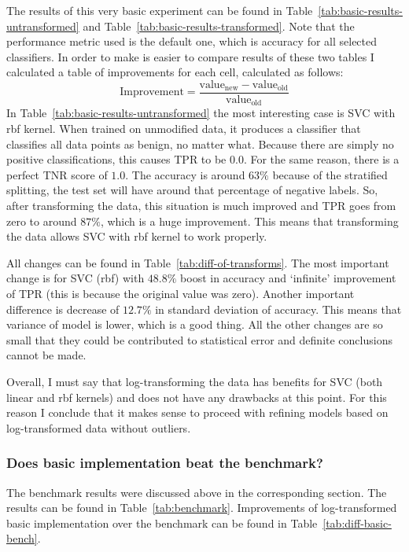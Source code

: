 \documentclass[10pt, a4paper]{article}
\begin{document}
The results of this very basic experiment can be found in Table~\ref{tab:basic-results-untransformed} and Table~\ref{tab:basic-results-transformed}. Note that the performance metric used is the default one, which is accuracy for all selected classifiers. In order to make is easier to compare results of these two tables I calculated a table of improvements for each cell, calculated as follows:
$$ \text{Improvement} = \frac{\text{value}_{\text{new}} - \text{value}_{\text{old}}}{\text{value}_{\text{old}}}  $$
In Table~\ref{tab:basic-results-untransformed} the most interesting case is SVC with rbf kernel. When trained on unmodified data, it produces a classifier that classifies all data points as benign, no matter what. Because there are simply no positive classifications, this causes TPR to be $0.0$. For the same reason, there is a perfect TNR score of $1.0$. The accuracy is around $63\%$ because of the stratified splitting, the test set will have around that percentage of negative labels. So, after transforming the data, this situation is much improved and TPR goes from zero to around $87\%$, which is a huge improvement. This means that transforming the data allows SVC with rbf kernel to work properly.

All changes can be found in Table~\ref{tab:diff-of-transforms}. The most important change is for SVC (rbf) with $48.8\%$ boost in accuracy and `infinite' improvement of TPR (this is because the original value was zero). Another important difference is decrease of $12.7\%$ in standard deviation of accuracy. This means that variance of model is lower, which is a good thing. All the other changes are so small that they could be contributed to statistical error and definite conclusions cannot be made.



Overall, I must say that log-transforming the data has benefits for SVC (both linear and rbf kernels) and does not have any drawbacks at this point. For this reason I conclude that it makes sense to proceed with refining models based on log-transformed data without outliers.

\subsubsection{Does basic implementation beat the benchmark?}

The benchmark results were discussed above in the corresponding section. The results can be found in Table~\ref{tab:benchmark}. Improvements of log-transformed basic implementation over the benchmark can be found in Table~\ref{tab:diff-basic-bench}.
\end{document}
